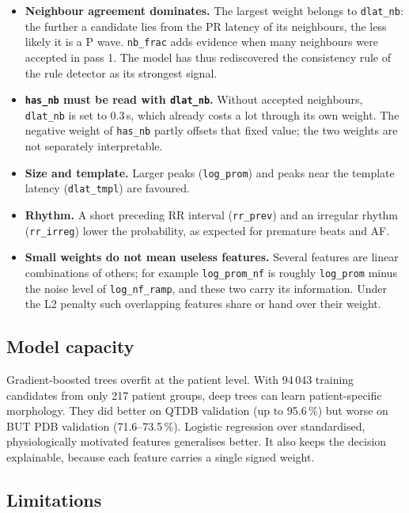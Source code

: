 \documentclass[11pt,a4paper]{article}
\newcommand{\code}[1]{\texttt{#1}}
\begin{document}
\begin{itemize}
\item \textbf{Neighbour agreement dominates.} The largest weight belongs to \code{dlat\_nb}: the further a candidate lies from the PR latency of its neighbours, the less likely it is a P wave. \code{nb\_frac} adds evidence when many neighbours were accepted in pass 1. The model has thus rediscovered the consistency rule of the rule detector as its strongest signal.
\item \textbf{\code{has\_nb} must be read with \code{dlat\_nb}.} Without accepted neighbours, \code{dlat\_nb} is set to 0.3\,s, which already costs a lot through its own weight. The negative weight of \code{has\_nb} partly offsets that fixed value; the two weights are not separately interpretable.
\item \textbf{Size and template.} Larger peaks (\code{log\_prom}) and peaks near the template latency (\code{dlat\_tmpl}) are favoured.
\item \textbf{Rhythm.} A short preceding RR interval (\code{rr\_prev}) and an irregular rhythm (\code{rr\_irreg}) lower the probability, as expected for premature beats and AF.
\item \textbf{Small weights do not mean useless features.} Several features are linear combinations of others; for example \code{log\_prom\_nf} is roughly \code{log\_prom} minus the noise level of \code{log\_nf\_ramp}, and these two carry its information. Under the L2 penalty such overlapping features share or hand over their weight.
\end{itemize}

\subsection{Model capacity}

Gradient-boosted trees overfit at the patient level. With 94\,043 training candidates from only 217 patient groups, deep trees can learn patient-specific morphology. They did better on QTDB validation (up to 95.6\,\%) but worse on BUT PDB validation (71.6--73.5\,\%). Logistic regression over standardised, physiologically motivated features generalises better. It also keeps the decision explainable, because each feature carries a single signed weight.

\subsection{Limitations}
\end{document}
